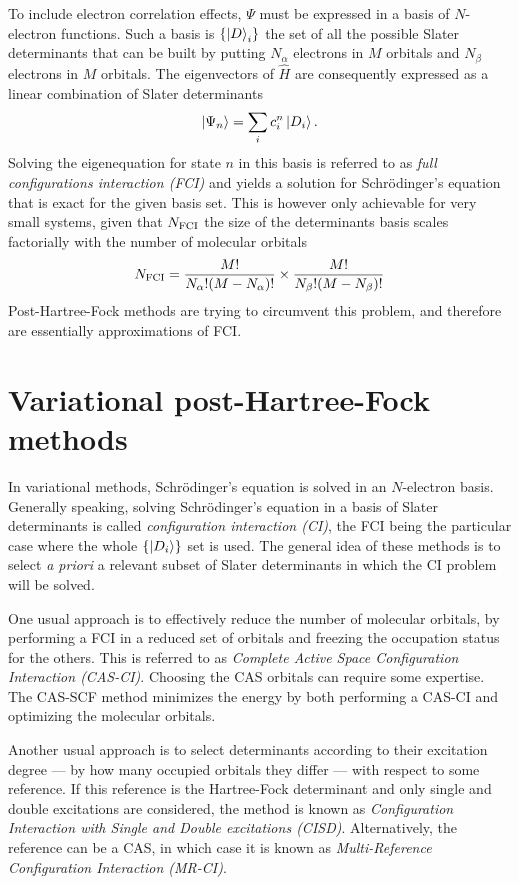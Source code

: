 \documentclass[./thesis.tex]{subfiles}
\begin{document}
To include electron correlation effects, $\Psi$ must be expressed in a basis of $N$-electron functions. Such a basis is $\{\ket D_i \}$ the set of all the possible Slater determinants that can be built by putting $N_\alpha$ electrons in $M$ orbitals and $N_\beta$ electrons in $M$ orbitals.
The eigenvectors of $\widehat{H}$ are consequently expressed as a linear combination of Slater determinants 
\begin{equation}
\ket{\Psi_n} = \sum_{i} c_i^n \ket{D_i}.
\end{equation}
Solving the eigenequation for state $n$ in this basis is referred to as \emph{full configurations interaction (FCI)} and yields a solution for Schrödinger's equation that is exact for the given basis set.
This is however only achievable for very small systems, given that $N_\text{FCI}$ the size of the determinants basis scales factorially with the number of molecular orbitals
\begin{equation}
N_\text{FCI} = \frac{M!}{N_\alpha ! (M-N_\alpha)!} \times \frac{M!}{N_\beta ! (M-N_\beta)!}
\end{equation}
Post-Hartree-Fock methods are trying to circumvent this problem, and therefore are essentially approximations of FCI.

\section{Variational post-Hartree-Fock methods}

In variational methods, Schrödinger's equation is solved in an $N$-electron basis.
Generally speaking, solving Schrödinger's equation in a basis of Slater determinants is called \emph{configuration interaction (CI)}, the FCI being the particular case where the whole $\{\ket {D_i} \}$ set is used. The general idea of these methods is to select \textit{a priori} a relevant subset of Slater determinants in which the CI problem will be solved.

One usual approach is to effectively reduce the number of molecular orbitals, by performing a FCI in a reduced set of orbitals and freezing the occupation status for the others. This is referred to as \emph{Complete Active Space Configuration Interaction (CAS-CI)}. Choosing the CAS orbitals can require some expertise. The CAS-SCF method minimizes the energy by both performing a CAS-CI and optimizing the molecular orbitals.

Another usual approach is to select determinants according to their excitation degree --- by how many occupied orbitals they differ --- with respect to some reference. If this reference is the Hartree-Fock determinant and only single and double excitations are considered, the method is known as \emph{Configuration Interaction with Single and Double excitations (CISD)}. Alternatively, the reference can be a CAS, in which case it is known as \emph{Multi-Reference Configuration Interaction (MR-CI)}.
\end{document}
